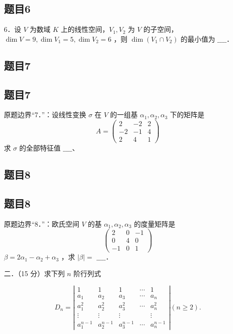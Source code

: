 \documentclass{article}
\begin{document}
\subsection{题目6}
6．设 \(V\) 为数域 \(K\) 上的线性空间，\(V_{1}, V_{2}\) 为 \(V\) 的子空间， \(\operatorname{dim} V=9, \operatorname{dim} V_{1}=5, \operatorname{dim} V_{2}=6\) ，则 \(\operatorname{dim}\left(V_{1} \cap V_{2}\right)\) 的最小值为 \(\_\_\_\_\)．

\begin{itemize}

\subsection{题目7}
\end{itemize}

\subsection{题目7}
原题边界“7．”：设线性变换 \(\sigma\) 在 \(V\) 的一组基 \(\alpha_{1}, \alpha_{2}, \alpha_{3}\) 下的矩阵是
\[
A=\left(\begin{array}{ccc}
2 & -2 & 2 \\
-2 & -1 & 4 \\
2 & 4 & 1
\end{array}\right)
\]
求 \(\sigma\) 的全部特征值 \(\_\_\_\_\)、

\subsection{题目8}

\subsection{题目8}
原题边界“8．”：欧氏空间 \(V\) 的基 \(\alpha_{1}, \alpha_{2}, \alpha_{3}\) 的度量矩阵是
\[
\left(\begin{array}{ccc}
2 & 0 & -1 \\
0 & 4 & 0 \\
-1 & 0 & 1
\end{array}\right)
\]
\(\beta=2 \alpha_{1}-\alpha_{2}+\alpha_{3}\) ，求 \(|\beta|=\) \(\_\_\_\_\)．

二．（15 分）求下列 \(n\) 阶行列式

\[
D_{n}=\left|\begin{array}{ccccc}
1 & 1 & 1 & \cdots & 1 \\
a_{1} & a_{2} & a_{3} & \cdots & a_{n} \\
a_{1}^{2} & a_{2}^{2} & a_{3}^{2} & \cdots & a_{n}^{2} \\
\vdots & \vdots & \vdots & & \vdots \\
a_{1}^{n-1} & a_{2}^{n-1} & a_{3}^{n-1} & \cdots & a_{n}^{n-1}
\end{array}\right|(n \geq 2) .
\]
\end{document}
